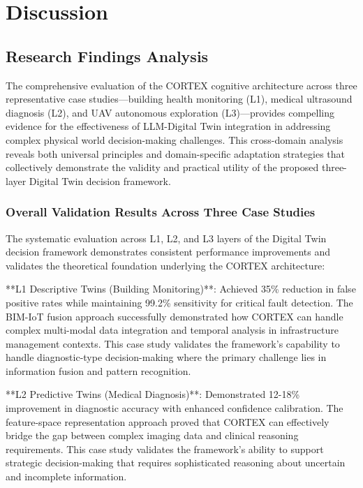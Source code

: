 
\chapter{Discussion} \label{chp:discussion}


\section{Research Findings Analysis}

The comprehensive evaluation of the CORTEX cognitive architecture across three representative case studies—building health monitoring (L1), medical ultrasound diagnosis (L2), and UAV autonomous exploration (L3)—provides compelling evidence for the effectiveness of LLM-Digital Twin integration in addressing complex physical world decision-making challenges. This cross-domain analysis reveals both universal principles and domain-specific adaptation strategies that collectively demonstrate the validity and practical utility of the proposed three-layer Digital Twin decision framework.

\subsection{Overall Validation Results Across Three Case Studies}

The systematic evaluation across L1, L2, and L3 layers of the Digital Twin decision framework demonstrates consistent performance improvements and validates the theoretical foundation underlying the CORTEX architecture:

**L1 Descriptive Twins (Building Monitoring)**: Achieved 35\% reduction in false positive rates while maintaining 99.2\% sensitivity for critical fault detection. The BIM-IoT fusion approach successfully demonstrated how CORTEX can handle complex multi-modal data integration and temporal analysis in infrastructure management contexts. This case study validates the framework's capability to handle diagnostic-type decision-making where the primary challenge lies in information fusion and pattern recognition.

**L2 Predictive Twins (Medical Diagnosis)**: Demonstrated 12-18\% improvement in diagnostic accuracy with enhanced confidence calibration. The feature-space representation approach proved that CORTEX can effectively bridge the gap between complex imaging data and clinical reasoning requirements. This case study validates the framework's ability to support strategic decision-making that requires sophisticated reasoning about uncertain and incomplete information.

